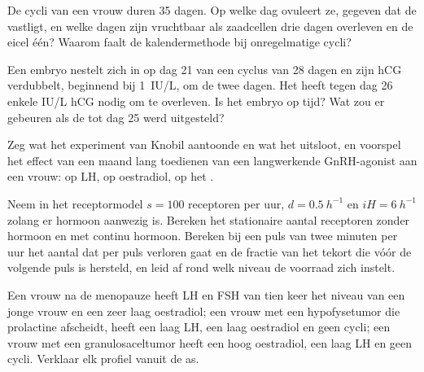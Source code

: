 \begin{exercise}[$\star\star$]\label{exo:b2:reproductive-hormones:7}
De cycli van een vrouw duren 35 dagen. Op welke dag ovuleert ze, gegeven
dat de  vastligt, en welke dagen zijn vruchtbaar als
zaadcellen drie dagen overleven en de eicel één? Waarom faalt de
kalendermethode bij onregelmatige cycli?
\end{exercise}

\begin{exercise}[$\star\star$]\label{exo:b2:reproductive-hormones:8}
Een embryo nestelt zich in op dag 21 van een cyclus van 28 dagen en zijn
hCG verdubbelt, beginnend bij \qty{1}{IU/L}, om de twee dagen. Het  heeft tegen dag 26 enkele IU/L hCG nodig om te overleven. Is het
embryo op tijd? Wat zou er gebeuren als de  tot dag 25 werd
uitgesteld?
\end{exercise}

\begin{exercise}[$\star\star$]\label{exo:b2:reproductive-hormones:9}
Zeg wat het experiment van Knobil aantoonde en wat het uitsloot, en
voorspel het effect van een maand lang toedienen van een langwerkende
GnRH-agonist aan een vrouw: op LH, op oestradiol, op het .
\end{exercise}

\begin{exercise}[$\star\star\star$]\label{exo:b2:reproductive-hormones:10}
Neem in het receptormodel $s = 100$ receptoren per uur, $d =
\qty{0.5}{h^{-1}}$ en $iH = \qty{6}{h^{-1}}$ zolang er hormoon aanwezig is.
Bereken het stationaire aantal receptoren zonder hormoon en met continu
hormoon. Bereken bij een puls van twee minuten per uur het aantal dat per
puls verloren gaat en de fractie van het tekort die vóór de volgende puls
is hersteld, en leid af rond welk niveau de voorraad zich instelt.
\end{exercise}

\begin{exercise}[$\star\star\star$]\label{exo:b2:reproductive-hormones:11}
Een vrouw na de menopauze heeft LH en FSH van tien keer het niveau van een
jonge vrouw en een zeer laag oestradiol; een vrouw met een hypofysetumor
die prolactine afscheidt, heeft een laag LH, een laag oestradiol en geen
cycli; een vrouw met een granulosaceltumor heeft een hoog oestradiol, een
laag LH en geen cycli. Verklaar elk profiel vanuit de as.
\end{exercise}

